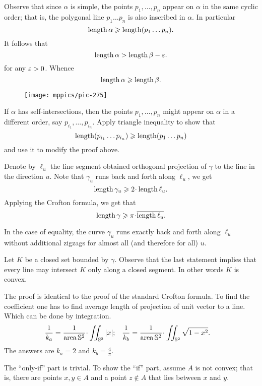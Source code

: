 Observe that since $\alpha$ is simple, the points $p_1,\dots,p_n$ appear on $\alpha$ in the same cyclic order;
that is, the polygonal line $p_1\dots p_n$ is also inscribed in $\alpha$.
In particular 
\[\mathop{\rm length}\nolimits\alpha\geqslant \mathop{\rm length}\nolimits (p_1\dots p_n).\]
It follows that 
\[\mathop{\rm length}\nolimits\alpha>\mathop{\rm length}\nolimits\beta-\varepsilon.\]
for any $\varepsilon>0$.
Whence 
\[\mathop{\rm length}\nolimits\alpha\geqslant\mathop{\rm length}\nolimits\beta.\]

\begin{wrapfigure}{r}{25 mm}
\vskip-0mm
\centering
\texttt{[image: mppics/pic-275]}
\vskip0mm
\end{wrapfigure}

If $\alpha$ has self-intersections, then the points $p_1,\dots, p_n$ might appear on $\alpha$ in a different order, say $p_{i_1},\dots,p_{i_n}$.
Apply triangle inequality to show that 
\[\mathop{\rm length}\nolimits(p_{i_1}\dots p_{i_n})\geqslant \mathop{\rm length}\nolimits (p_1\dots p_n)\]
and use it to modify the proof above.

Denote by $\ell_u$ the line segment 
obtained orthogonal projection of $\gamma$ to the line in the direction $u$.
Note that $\gamma_u$ runs back and forth along $\ell_u$, we get 
\[\length\gamma_u\ge 2\cdot\length\ell_u.\]
Applying the Crofton formula, we get that 
\[\length\gamma\ge \pi\cdot \overline{\length\ell_u}.\]

In the case of equality, the curve $\gamma_u$ runs exactly back and forth along $\ell_u$ without additional zigzags for almost all (and therefore for all) $u$.

Let $K$ be a closed set bounded by $\gamma$.
Observe that the last statement implies that every line may intersect $K$ only along a closed segment.
In other words $K$ is convex.

The proof is identical to the proof of the standard Crofton formula.
To find the coefficient one has to find average length of projection of unit vector to a line.
Which can be done by integration.
\begin{align*}
\frac1{k_a}&=\frac{1}{\area \mathbb{S}^2}\cdot\iint_{\mathbb{S}^2} |x|;
&
\frac1{k_b}&=\frac{1}{\area \mathbb{S}^2}\cdot\iint_{\mathbb{S}^2} \sqrt{1-x^2}.
\end{align*}
The answers are $k_a=2$ and $k_b=\tfrac4\pi$.

The ``only-if'' part is trivial.
To show the ``if'' part, assume $A$ is not convex;
that is, there are points $x,y\in A$ and a point $z\notin A$ that lies between $x$ and $y$.

